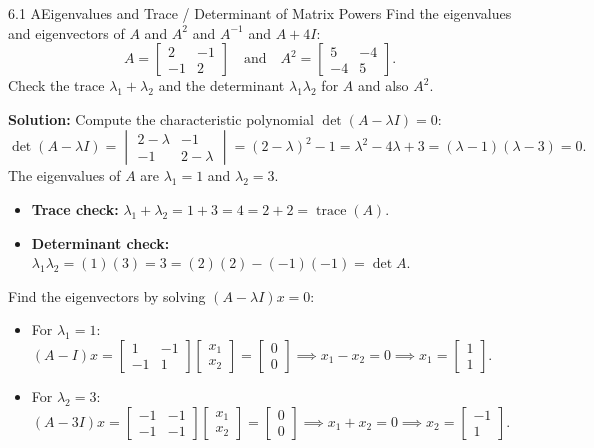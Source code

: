 \documentclass[11pt,a4paper,openany,oneside]{book}
\def\vect#1{#1}%
\def\mathbf#1{#1}%
\newcommand{\vect}[1]{\mathbf{#1}}
\numberwithin{equation}{chapter}
\begin{document}
\begin{example}{6.1 A}{Eigenvalues and Trace / Determinant of Matrix Powers}
Find the eigenvalues and eigenvectors of $A$ and $A^2$ and $A^{-1}$ and $A+4I$:
\[
A = \begin{bmatrix} 2 & -1 \\ -1 & 2 \end{bmatrix} \quad \text{and} \quad A^2 = \begin{bmatrix} 5 & -4 \\ -4 & 5 \end{bmatrix}.
\]
Check the trace $\lambda_1 + \lambda_2$ and the determinant $\lambda_1\lambda_2$ for $A$ and also $A^2$.
\end{example}
\textbf{Solution:} Compute the characteristic polynomial $\det(A - \lambda I) = 0$:
\[
\det(A - \lambda I) = \begin{vmatrix} 2-\lambda & -1 \\ -1 & 2-\lambda \end{vmatrix} = (2-\lambda)^2 - 1 = \lambda^2 - 4\lambda + 3 = (\lambda - 1)(\lambda - 3) = 0.
\]
The eigenvalues of $A$ are $\lambda_1 = 1$ and $\lambda_2 = 3$.
\begin{itemize}
\item \textbf{Trace check:} $\lambda_1 + \lambda_2 = 1 + 3 = 4 = 2 + 2 = \operatorname{trace}(A)$.
\item \textbf{Determinant check:} $\lambda_1\lambda_2 = (1)(3) = 3 = (2)(2) - (-1)(-1) = \det A$.
\end{itemize}
Find the eigenvectors by solving $(A - \lambda I)\vect{x} = \vect{0}$:
\begin{itemize}
\item For $\lambda_1 = 1$: $(A - I)\vect{x} = \begin{bmatrix} 1 & -1 \\ -1 & 1 \end{bmatrix}\begin{bmatrix} x_1 \\ x_2 \end{bmatrix} = \begin{bmatrix} 0 \\ 0 \end{bmatrix} \implies x_1 - x_2 = 0 \implies \vect{x}_1 = \begin{bmatrix} 1 \\ 1 \end{bmatrix}$.
\item For $\lambda_2 = 3$: $(A - 3I)\vect{x} = \begin{bmatrix} -1 & -1 \\ -1 & -1 \end{bmatrix}\begin{bmatrix} x_1 \\ x_2 \end{bmatrix} = \begin{bmatrix} 0 \\ 0 \end{bmatrix} \implies x_1 + x_2 = 0 \implies \vect{x}_2 = \begin{bmatrix} -1 \\ 1 \end{bmatrix}$.
\end{itemize}
\end{document}
